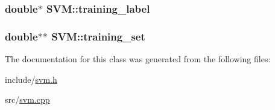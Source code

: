 \subsubsection[{training\+\_\+label}]{\setlength{\rightskip}{0pt plus 5cm}double$\ast$ S\+V\+M\+::training\+\_\+label}\hypertarget{classSVM_a4a2cfc7a3b8b1e65a8edd81ffc0985ba}{}\label{classSVM_a4a2cfc7a3b8b1e65a8edd81ffc0985ba}
\subsubsection[{training\+\_\+set}]{\setlength{\rightskip}{0pt plus 5cm}double$\ast$$\ast$ S\+V\+M\+::training\+\_\+set}\hypertarget{classSVM_a0d63a10c574ace471efcd8e6553b7bd9}{}\label{classSVM_a0d63a10c574ace471efcd8e6553b7bd9}


The documentation for this class was generated from the following files\+:\begin{DoxyCompactItemize}
\item 
include/\hyperlink{svm_8h}{svm.\+h}\item 
src/\hyperlink{svm_8cpp}{svm.\+cpp}\end{DoxyCompactItemize}
